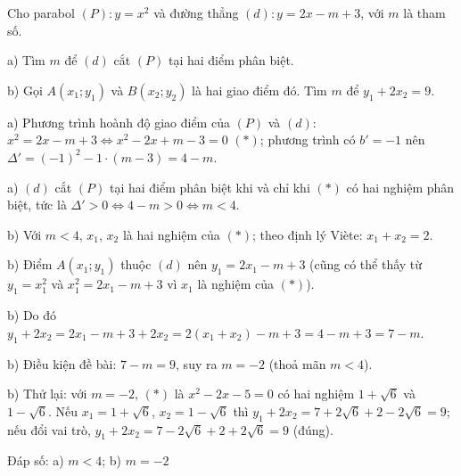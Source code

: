 \begin{problem}[9DS-HSB2-018]
Cho parabol $(P)\colon y = x^2$ và đường thẳng $(d)\colon y = 2x - m + 3$, với $m$ là tham số.

a) Tìm $m$ để $(d)$ cắt $(P)$ tại hai điểm phân biệt.

b) Gọi $A(x_1; y_1)$ và $B(x_2; y_2)$ là hai giao điểm đó. Tìm $m$ để $y_1 + 2x_2 = 9$.

\begin{solution}
a) Phương trình hoành độ giao điểm của $(P)$ và $(d)$: $x^2 = 2x - m + 3 \Leftrightarrow x^2 - 2x + m - 3 = 0$ $(*)$; phương trình có $b' = -1$ nên $\Delta' = (-1)^2 - 1 \cdot (m - 3) = 4 - m$.

a) $(d)$ cắt $(P)$ tại hai điểm phân biệt khi và chỉ khi $(*)$ có hai nghiệm phân biệt, tức là $\Delta' > 0 \Leftrightarrow 4 - m > 0 \Leftrightarrow m < 4$.

b) Với $m < 4$, $x_1$, $x_2$ là hai nghiệm của $(*)$; theo định lý Viète: $x_1 + x_2 = 2$.

b) Điểm $A(x_1; y_1)$ thuộc $(d)$ nên $y_1 = 2x_1 - m + 3$ (cũng có thể thấy từ $y_1 = x_1^2$ và $x_1^2 = 2x_1 - m + 3$ vì $x_1$ là nghiệm của $(*)$).

b) Do đó $y_1 + 2x_2 = 2x_1 - m + 3 + 2x_2 = 2(x_1 + x_2) - m + 3 = 4 - m + 3 = 7 - m$.

b) Điều kiện đề bài: $7 - m = 9$, suy ra $m = -2$ (thoả mãn $m < 4$).

b) Thử lại: với $m = -2$, $(*)$ là $x^2 - 2x - 5 = 0$ có hai nghiệm $1 + \sqrt{6}$ và $1 - \sqrt{6}$. Nếu $x_1 = 1 + \sqrt{6}$, $x_2 = 1 - \sqrt{6}$ thì $y_1 + 2x_2 = 7 + 2\sqrt{6} + 2 - 2\sqrt{6} = 9$; nếu đổi vai trò, $y_1 + 2x_2 = 7 - 2\sqrt{6} + 2 + 2\sqrt{6} = 9$ (đúng).

Đáp số: a) $\boxed{m < 4}$; b) $\boxed{m = -2}$
\end{solution}
\end{problem}

